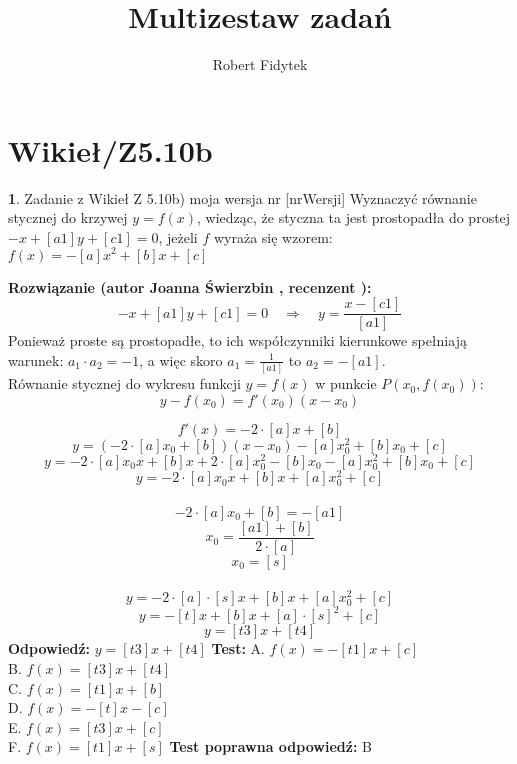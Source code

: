 \documentclass[12pt, a4paper]{article}
\title{Multizestaw zadań}
\author{Robert Fidytek}
\date{}
\theoremstyle{definition} %
\newtheorem{zad}{}
\newcommand{\kategoria}[1]{\section{#1}} %
\newcommand{\zadStart}[1]{\begin{zad}#1\newline} %
\newcommand{\zadStop}{\end{zad}}   %
\newcommand{\rozwStart}[2]{\noindent \textbf{Rozwiązanie (autor #1 , recenzent #2): }\newline} %
\newcommand{\rozwStop}{\newline}                                            %
\newcommand{\odpStart}{\noindent \textbf{Odpowiedź:}\newline}    %
\newcommand{\odpStop}{\newline}                                             %
\newcommand{\testStart}{\noindent \textbf{Test:}\newline} %
\newcommand{\testStop}{\newline} %
\newcommand{\kluczStart}{\noindent \textbf{Test poprawna odpowiedź:}\newline} %
\newcommand{\kluczStop}{\newline} %
\begin{document}
\maketitle


\kategoria{Wikieł/Z5.10b}
\zadStart{Zadanie z Wikieł Z 5.10b) moja wersja nr [nrWersji]}
Wyznaczyć równanie stycznej do krzywej $y=f(x)$, wiedząc, że styczna ta jest prostopadła do prostej $-x+[a1]y+[c1]=0$, jeżeli $f$ wyraża się wzorem:\\
$f(x)=-[a]x^2+[b]x+[c] $
\zadStop
\rozwStart{Joanna Świerzbin}{}
$$
-x+[a1]y+[c1]=0 \quad \Rightarrow \quad y=\frac{x-[c1]}{[a1]}
$$
Ponieważ proste są prostopadłe, to ich współczynniki kierunkowe spełniają warunek: $ a_1 \cdot a_2 =-1$, a więc skoro $a_1 = \frac{1}{[a1]}$ to $ a_2= - [a1]$. \\
Równanie stycznej do wykresu funkcji $y=f(x)$ w punkcie $P(x_0,f(x_0))$:
$$
y-f(x_0)=f'(x_0)(x-x_0)
$$

$$f'(x)=-2\cdot[a]x+[b]$$
$$ y = (-2\cdot[a]x_0+[b])(x-x_0)-[a]x_0^2+[b]x_0+[c] $$
$$ y = -2\cdot[a]x_0x+[b]x+2\cdot[a]x_0^2-[b]x_0-[a]x_0^2+[b]x_0+[c] $$
$$ y =-2\cdot [a]x_0x+[b]x+[a]x_0^2+[c] $$ \\
$$ -2\cdot [a]x_0+[b] = - [a1] $$
$$ x_0 =  \frac{[a1] + [b]}{2\cdot[a]}$$
$$ x_0 = [s]$$\\

$$ y =-2\cdot [a]\cdot[s]x+[b]x+[a]x_0^2+[c] $$
$$ y =-[t]x+[b]x+[a]\cdot[s]^2+[c] $$
$$ y =[t3]x+[t4] $$
\rozwStop
\odpStart
$ y =[t3]x+[t4] $
\odpStop
\testStart
A. $f(x)=-[t1]x + [c]$\\
B. $f(x)=[t3]x + [t4]$\\
C. $f(x)=[t1]x+[b]$\\
D. $f(x)=-[t]x - [c]$\\
E. $f(x)=[t3]x+ [c]$\\
F. $f(x)=[t1]x + [s]$
\testStop
\kluczStart
B
\kluczStop
\end{document}
